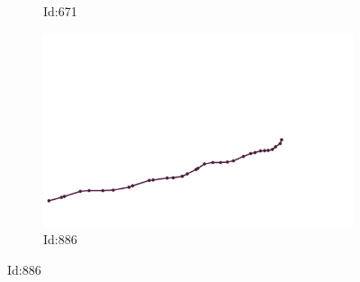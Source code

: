 \documentclass[12pt,twoside]{report}
\begin{document}
\begin{figure}
\begin{subfigure}[b]{0.20\textwidth}
\caption{Id:671}
\end{subfigure}
\begin{subfigure}[b]{0.20\textwidth}
\centering
\includegraphics[width=\textwidth]{../../trajectories/886.png}
\caption{Id:886}
\end{subfigure}
\end{figure}
\end{document}
